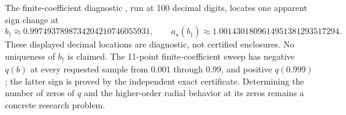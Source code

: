 The finite-coefficient diagnostic
, run at 100 decimal
digits, locates one apparent sign change at
\[
 b_\dagger\approx0.9974937898734204210746055931,\qquad
 a_\star(b_\dagger)\approx1.0014301809614951381293517294.
\]
These displayed decimal locations are diagnostic, not certified
enclosures. No uniqueness of $b_\dagger$ is claimed. The 11-point
finite-coefficient sweep has negative $q(b)$ at every requested
sample from $0.001$ through $0.99$, and positive $q(0.999)$;
the latter sign is proved by the independent exact certificate.
Determining the number of zeros of $q$ and the higher-order radial
behavior at its zeros remains a concrete research problem.

